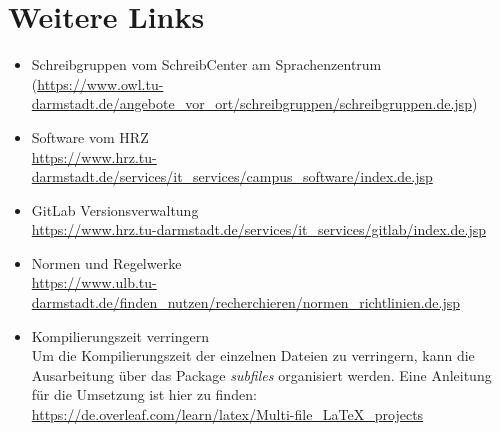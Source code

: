 \section{Weitere Links}
\begin{sloppypar}
\begin{itemize}
    \item Schreibgruppen vom SchreibCenter am Sprachenzentrum\\ (\url{https://www.owl.tu-darmstadt.de/angebote_vor_ort/schreibgruppen/schreibgruppen.de.jsp})
    \item Software vom HRZ\\
\url{https://www.hrz.tu-darmstadt.de/services/it_services/campus_software/index.de.jsp}
    \item GitLab Versionsverwaltung\\ \url{https://www.hrz.tu-darmstadt.de/services/it_services/gitlab/index.de.jsp}
    \item Normen und Regelwerke\\
\url{https://www.ulb.tu-darmstadt.de/finden_nutzen/recherchieren/normen_richtlinien.de.jsp}
    \item Kompilierungszeit verringern\\
Um die Kompilierungszeit der einzelnen Dateien zu verringern, kann die Ausarbeitung über das Package \textit{subfiles} organisiert werden. Eine Anleitung für die Umsetzung ist hier zu finden: \url{https://de.overleaf.com/learn/latex/Multi-file_LaTeX_projects}

\end{itemize}
\end{sloppypar}